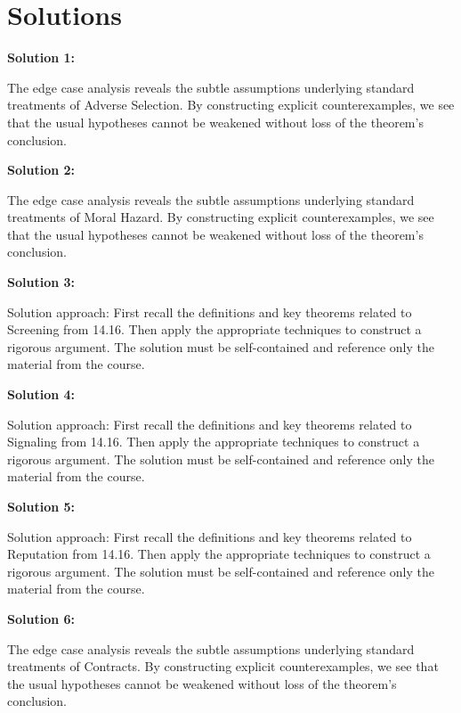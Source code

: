 \documentclass[12pt,a4paper]{exam}
\begin{document}
\newpage
\section*{Solutions}

\textbf{Solution 1:}

The edge case analysis reveals the subtle assumptions underlying standard treatments of Adverse Selection. By constructing explicit counterexamples, we see that the usual hypotheses cannot be weakened without loss of the theorem's conclusion.

\vspace{0.5cm}

\textbf{Solution 2:}

The edge case analysis reveals the subtle assumptions underlying standard treatments of Moral Hazard. By constructing explicit counterexamples, we see that the usual hypotheses cannot be weakened without loss of the theorem's conclusion.

\vspace{0.5cm}

\textbf{Solution 3:}

Solution approach: First recall the definitions and key theorems related to Screening from 14.16. Then apply the appropriate techniques to construct a rigorous argument. The solution must be self-contained and reference only the material from the course.

\vspace{0.5cm}

\textbf{Solution 4:}

Solution approach: First recall the definitions and key theorems related to Signaling from 14.16. Then apply the appropriate techniques to construct a rigorous argument. The solution must be self-contained and reference only the material from the course.

\vspace{0.5cm}

\textbf{Solution 5:}

Solution approach: First recall the definitions and key theorems related to Reputation from 14.16. Then apply the appropriate techniques to construct a rigorous argument. The solution must be self-contained and reference only the material from the course.

\vspace{0.5cm}

\textbf{Solution 6:}

The edge case analysis reveals the subtle assumptions underlying standard treatments of Contracts. By constructing explicit counterexamples, we see that the usual hypotheses cannot be weakened without loss of the theorem's conclusion.
\end{document}
